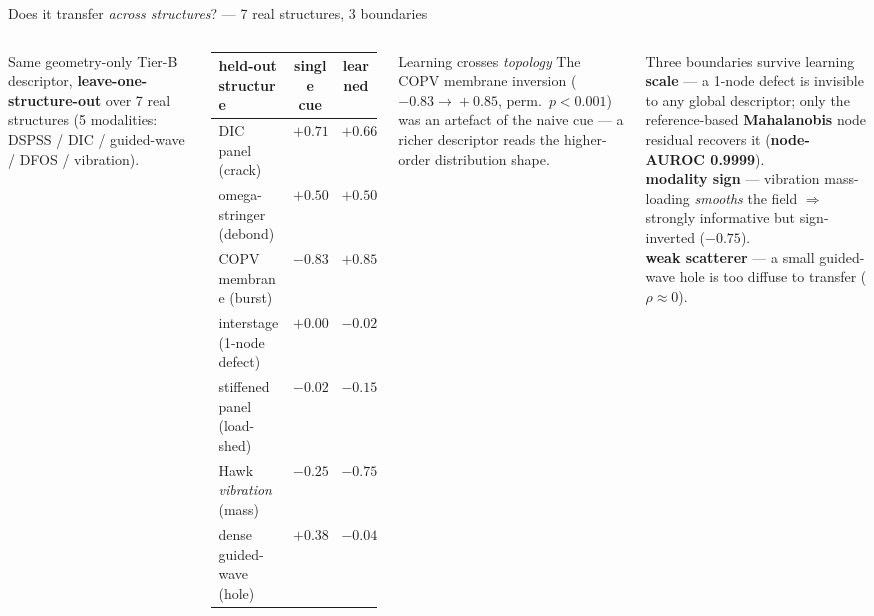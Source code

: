 \documentclass[aspectratio=169,10pt]{beamer}
\begin{document}
\begin{frame}{Does it transfer \emph{across structures}? --- 7 real structures, 3 boundaries}
\begin{columns}[T]
{\small Same geometry-only Tier-B descriptor, \textbf{leave-one-structure-out} over 7 real
structures (5 modalities: DSPSS / DIC / guided-wave / DFOS / vibration).}
\vspace{1mm}\\
\scriptsize
\begin{tabular}{lcc}
\toprule
held-out structure & single cue & learned \\
\midrule
DIC panel (crack)            & $+0.71$ & $+0.66$ \\
omega-stringer (debond)      & $+0.50$ & $+0.50$ \\
COPV membrane (burst)        & $-0.83$ & \textcolor{okgreen}{$+0.85$} \\
interstage (1-node defect)   & $+0.00$ & \textcolor{alertred}{$-0.02$} \\
stiffened panel (load-shed)  & $-0.02$ & $-0.15$ \\
Hawk \emph{vibration} (mass) & $-0.25$ & \textcolor{alertred}{$-0.75$} \\
dense guided-wave (hole)     & $+0.38$ & \textcolor{alertred}{$-0.04$} \\
\bottomrule
\end{tabular}
\begin{block}{Learning crosses \emph{topology}}
\small The COPV membrane inversion ($-0.83\!\to\!+0.85$, perm.\ $p{<}0.001$) was an artefact of the
naive cue --- a richer descriptor reads the higher-order distribution shape.
\end{block}
\begin{alertblock}{Three boundaries survive learning}
\scriptsize
\textbf{scale} --- a 1-node defect is invisible to any global descriptor; only the reference-based
\textbf{Mahalanobis} node residual recovers it (\textbf{node-AUROC 0.9999}).\\[1pt]
\textbf{modality sign} --- vibration mass-loading \emph{smooths} the field $\Rightarrow$ strongly
informative but sign-inverted ($-0.75$).\\[1pt]
\textbf{weak scatterer} --- a small guided-wave hole is too diffuse to transfer ($\rho\!\approx\!0$).
\end{alertblock}
\end{columns}
\end{frame}
\end{document}
